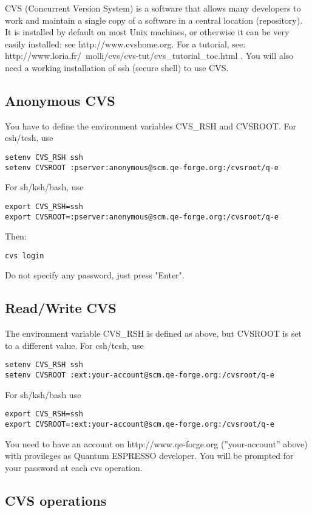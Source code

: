 \documentclass[12pt,a4paper]{article}
\begin{document}
CVS (Concurrent Version System) is a software that allows many
developers to work and maintain a single copy of a software in a
central location (repository). It is installed by default on most Unix
machines, or otherwise it can be very easily installed: see
http://www.cvshome.org. For a tutorial, see: 
http://www.loria.fr/~molli/cvs/cvs-tut/cvs\_tutorial\_toc.html .
You will also need a working installation of ssh (secure shell) to use CVS.

\subsection{Anonymous CVS}

You have to define the environment variables CVS\_RSH and CVSROOT.
For csh/tcsh, use
\begin{verbatim}
setenv CVS_RSH ssh
setenv CVSROOT :pserver:anonymous@scm.qe-forge.org:/cvsroot/q-e
\end{verbatim}
For sh/ksh/bash, use
\begin{verbatim}
export CVS_RSH=ssh
export CVSROOT=:pserver:anonymous@scm.qe-forge.org:/cvsroot/q-e 
\end{verbatim}
Then:
\begin{verbatim}
cvs login
\end{verbatim}
Do not specify any password, just press "Enter".

\subsection{Read/Write CVS}

The environment variable CVS\_RSH is defined as above, but CVSROOT is
set to a different value. For csh/tcsh, use
\begin{verbatim}
setenv CVS_RSH ssh
setenv CVSROOT :ext:your-account@scm.qe-forge.org:/cvsroot/q-e 
\end{verbatim}
For sh/ksh/bash use
\begin{verbatim}
export CVS_RSH=ssh
export CVSROOT=:ext:your-account@scm.qe-forge.org:/cvsroot/q-e 
\end{verbatim}
You need to have an account on http://www.qe-forge.org
(''your-account'' above) with provileges as Quantum ESPRESSO developer.
You will be prompted for your password at each cvs operation.

\subsection{CVS operations}
\end{document}
